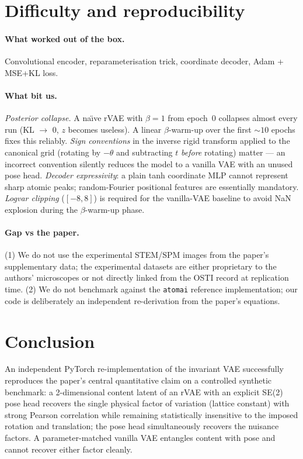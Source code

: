 \documentclass[11pt]{article}
\begin{document}
\section{Difficulty and reproducibility}

\paragraph{What worked out of the box.}
Convolutional encoder, reparameterisation trick, coordinate decoder,
Adam + MSE+KL loss.

\paragraph{What bit us.}
\emph{Posterior collapse.} A na\"\i ve rVAE with $\beta=1$ from epoch~0
collapses almost every run (KL $\to$ 0, $z$ becomes useless). A linear
$\beta$-warm-up over the first $\sim 10$ epochs fixes this reliably.
\emph{Sign conventions} in the inverse rigid transform applied to the
canonical grid (rotating by $-\theta$ and subtracting $t$ \emph{before}
rotating) matter --- an incorrect convention silently reduces the model
to a vanilla VAE with an unused pose head.
\emph{Decoder expressivity}: a plain tanh coordinate MLP cannot
represent sharp atomic peaks; random-Fourier positional features are
essentially mandatory.
\emph{Logvar clipping} ($[-8, 8]$) is required for the vanilla-VAE
baseline to avoid NaN explosion during the $\beta$-warm-up phase.

\paragraph{Gap vs the paper.}
(1) We do not use the experimental STEM/SPM images from the paper's
supplementary data; the experimental datasets are either proprietary to
the authors' microscopes or not directly linked from the OSTI record at
replication time. (2) We do not benchmark against the \texttt{atomai}
reference implementation; our code is deliberately an independent
re-derivation from the paper's equations.

\section{Conclusion}
An independent PyTorch re-implementation of the invariant VAE
successfully reproduces the paper's central quantitative claim on a
controlled synthetic benchmark: a 2-dimensional content latent of an
rVAE with an explicit SE(2) pose head recovers the single physical
factor of variation (lattice constant) with strong Pearson correlation
while remaining statistically insensitive to the imposed rotation and
translation; the pose head simultaneously recovers the nuisance
factors. A parameter-matched vanilla VAE entangles content with pose
and cannot recover either factor cleanly.
\end{document}
